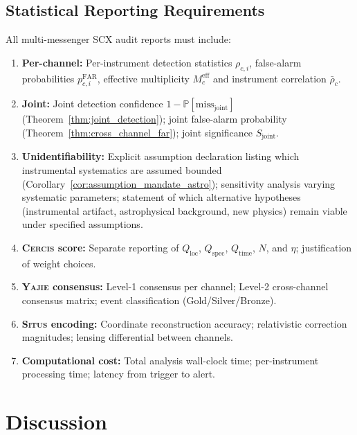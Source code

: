 \documentclass[11pt,a4paper]{article}
\theoremstyle{definition}
\newcommand{\Situs}{\textsc{Situs}}
\newcommand{\Yajie}{\textsc{Yajie}}
\newcommand{\Cercis}{\textsc{Cercis}}
\newcommand{\SCX}{\textsc{SCX}}
\newcommand{\Pbb}{\mathbb{P}}
\begin{document}
\subsection{Statistical Reporting Requirements}
All multi-messenger \SCX{} audit reports must include:
\begin{enumerate}[label=(\arabic*)]
    \item \textbf{Per-channel:} Per-instrument detection statistics $\rho_{c,i}$, false-alarm probabilities $p_{c,i}^{\mathrm{FAR}}$, effective multiplicity $M_c^{\mathrm{eff}}$ and instrument correlation $\bar{\rho}_c$.
    \item \textbf{Joint:} Joint detection confidence $1 - \Pbb[\text{miss}_{\mathrm{joint}}]$ (Theorem~\ref{thm:joint_detection}); joint false-alarm probability (Theorem~\ref{thm:cross_channel_far}); joint significance $S_{\mathrm{joint}}$.
    \item \textbf{Unidentifiability:} Explicit assumption declaration listing which instrumental systematics are assumed bounded (Corollary~\ref{cor:assumption_mandate_astro}); sensitivity analysis varying systematic parameters; statement of which alternative hypotheses (instrumental artifact, astrophysical background, new physics) remain viable under specified assumptions.
    \item \textbf{\Cercis{} score:} Separate reporting of $Q_{\mathrm{loc}}$, $Q_{\mathrm{spec}}$, $Q_{\mathrm{time}}$, $N$, and $\eta$; justification of weight choices.
    \item \textbf{\Yajie{} consensus:} Level-1 consensus per channel; Level-2 cross-channel consensus matrix; event classification (Gold/Silver/Bronze).
    \item \textbf{\Situs{} encoding:} Coordinate reconstruction accuracy; relativistic correction magnitudes; lensing differential between channels.
    \item \textbf{Computational cost:} Total analysis wall-clock time; per-instrument processing time; latency from trigger to alert.
\end{enumerate}
\section{Discussion}
\label{sec:discussion}
\end{document}
